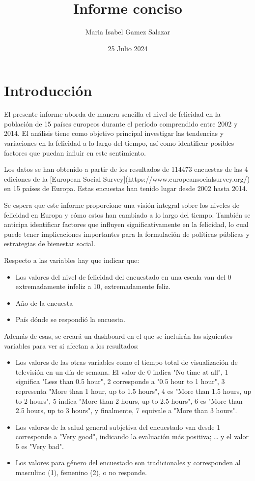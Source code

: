 \documentclass{article}
\title{Informe conciso}
\author {Maria Isabel Gamez Salazar}
\date {25 Julio 2024}
\begin{document}

\maketitle
\section {Introducción}

\noindent El presente informe aborda de manera sencilla el nivel de felicidad en la población de 15 países europeos durante el período comprendido entre 2002 y 2014. El análisis tiene como objetivo principal investigar las tendencias y variaciones en la felicidad a lo largo del tiempo, así como identificar posibles factores que puedan influir en este sentimiento.


Los datos se han obtenido a partir de los resultados de 114473 encuestas de las 4 ediciones de la [European Social Survey](https://www.europeansocialsurvey.org/) en 15 países de Europa. Estas encuestas han tenido lugar desde 2002 hasta 2014.


Se espera que este informe proporcione una visión integral sobre los niveles de felicidad en Europa y cómo estos han cambiado a lo largo del tiempo. También se anticipa identificar factores que influyen significativamente en la felicidad, lo cual puede tener implicaciones importantes para la formulación de políticas públicas y estrategias de bienestar social.


Respecto a las variables hay que indicar que:
\begin{itemize}
\item Los valores del nivel de felicidad del encuestado en una escala van del 0 extremadamente infeliz a 10, extremadamente feliz. 
\item Año de la encuesta
\item País dónde se respondió la encuesta.
\end{itemize}

Además de esas, se creará un dashboard en el que se incluirán las siguientes variables para ver si afectan a los resultados:

\begin{itemize}

\item Los valores de las otras variables como el tiempo total de visualización de televisión en un día de semana. El valor de 0 indica "No time at all", 1 significa "Less than 0.5 hour", 2 corresponde a "0.5 hour to 1 hour", 3 representa "More than 1 hour, up to 1.5 hours", 4 es "More than 1.5 hours, up to 2 hours", 5 indica "More than 2 hours, up to 2.5 hours", 6 es "More than 2.5 hours, up to 3 hours", y finalmente, 7 equivale a "More than 3 hours".

\item Los valores de la salud general subjetiva del encuestado van desde 1 corresponde a "Very good", indicando la evaluación más positiva; … y el valor 5 es "Very bad".

\item Los valores para género del encuestado son tradicionales y corresponden al masculino (1), femenino (2), o no responde.

\end{itemize}
\end{document}

